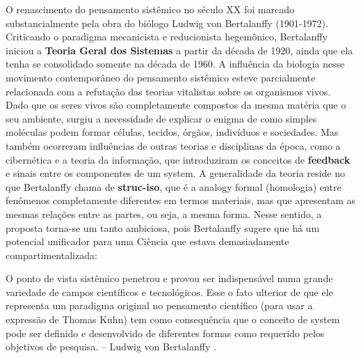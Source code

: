 \documentclass[./main.tex]{subfiles}
\begin{document}
\par O renascimento do pensamento sistêmico no século XX foi marcado substancialmente pela obra do biólogo Ludwig von Bertalanffy (1901-1972). Criticando o \gls{paradigma} mecanicista e reducionista hegemônico, Bertalanffy iniciou a \textbf{Teoria Geral dos Sistemas} a partir da década de 1920, ainda que ela tenha se consolidado somente na década de 1960. A influência da biologia nesse movimento contemporâneo do pensamento sistêmico esteve parcialmente relacionada com a refutação das teorias vitalistas sobre os organismos vivos. Dado que os seres vivos são completamente compostos da mesma matéria que o seu ambiente, surgiu a necessidade de explicar o enigma de como simples moléculas podem formar células, tecidos, órgãos, indivíduos e sociedades. Mas também ocorreram influências de outras teorias e disciplinas da época, como a cibernética e a \gls{teoria} da informação, que introduziram os conceitos de \textbf{\gls{feedback}} e sinais entre os componentes de um \gls{system}. A generalidade da \gls{teoria} reside no que Bertalanffy chama de \textbf{\gls{struc-iso}}, que é a \gls{analogy} formal (homologia) entre fenômenos completamente diferentes em termos materiais, mas que apresentam as mesmas relações entre as partes, ou seja, a mesma forma. Nesse sentido, a proposta torna-se um tanto ambiciosa, pois Bertalanffy sugere que há um potencial unificador para uma Ciência que estava demasiadamente compartimentalizada:
\begin{adjustwidth}{100pt}{0pt}
\medskip
\small O ponto de vista sistêmico penetrou e provou ser indispensável numa grande variedade de campos científicos e tecnológicos. Esse o fato ulterior de que ele representa um \gls{paradigma} original no pensamento científico (para usar a expressão de Thomas Kuhn) tem como consequência que o conceito de \gls{system} pode ser definido e desenvolvido de diferentes formas como requerido pelos objetivos de pesquisa. -- Ludwig von Bertalanffy \cite{bertalanffy}.
\medskip
\end{adjustwidth}
\end{document}
